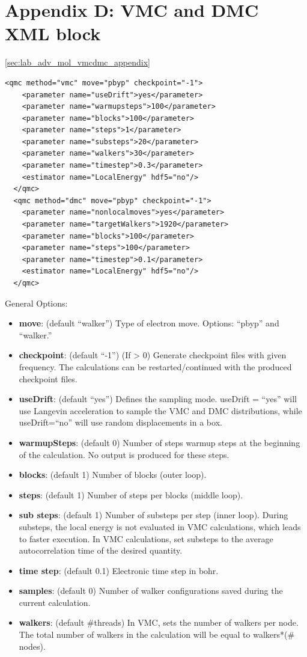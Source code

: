 {\newpage
\section{Appendix D: VMC and DMC XML block}\ref{sec:lab_adv_mol_vmcdmc_appendix}

\begin{lstlisting}[style=QMCPXML,caption=``Sample XML blocks for VMC and DMC calculations.",label=lst:lam_xml_vmc_dmc]
  <qmc method="vmc" move="pbyp" checkpoint="-1">
    <parameter name="useDrift">yes</parameter>
    <parameter name="warmupsteps">100</parameter>
    <parameter name="blocks">100</parameter>
    <parameter name="steps">1</parameter>
    <parameter name="substeps">20</parameter>
    <parameter name="walkers">30</parameter>
    <parameter name="timestep">0.3</parameter>
    <estimator name="LocalEnergy" hdf5="no"/>
  </qmc>
  <qmc method="dmc" move="pbyp" checkpoint="-1">
    <parameter name="nonlocalmoves">yes</parameter>
    <parameter name="targetWalkers">1920</parameter>
    <parameter name="blocks">100</parameter>
    <parameter name="steps">100</parameter>
    <parameter name="timestep">0.1</parameter>
    <estimator name="LocalEnergy" hdf5="no"/>
  </qmc>
\end{lstlisting}

General Options:
\begin{itemize}
\item{\textbf{move}: (default ``walker”) Type of electron move. Options: ``pbyp” and ``walker.”}
\item{\textbf{checkpoint}: (default ``-1”) (If > 0) Generate checkpoint files with given frequency.
The calculations can be restarted/continued with the produced checkpoint files.}
\item{\textbf{useDrift}: (default ``yes”) Defines the sampling mode. useDrift = ``yes” will
use Langevin acceleration to sample the VMC and DMC distributions, while
useDrift=``no” will use random displacements in a box.}
\item{\textbf{warmupSteps}: (default 0) Number of steps warmup steps at the beginning of the
calculation. No output is produced for these steps.}
\item{\textbf{blocks}: (default 1) Number of blocks (outer loop).}
\item{\textbf{steps}: (default 1) Number of steps per blocks (middle loop).}
\item{\textbf{sub steps}: (default 1) Number of substeps per step (inner loop). During substeps,
the local energy is not evaluated in VMC calculations, which leads to faster execution.
In VMC calculations, set substeps to the average autocorrelation time of the desired
quantity.}
\item{\textbf{time step}: (default 0.1) Electronic time step in bohr.}
\item{\textbf{samples}: (default 0) Number of walker configurations saved during the current 
calculation.}
\item{\textbf{walkers}: (default \#threads) In VMC, sets the number of walkers per node. The total
number of walkers in the calculation will be equal to walkers*(\# nodes).}
\end{itemize}

}
